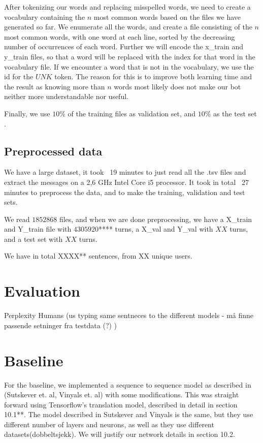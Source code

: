 \documentclass{article} %
\begin{document}
After tokenizing our words and replacing misspelled words, we need to create a vocabulary containing the $n$ most common words based on the files we have generated so far. We enumerate all the words, and create a file consisting of the $n$ most common words, with one word at each line, sorted by the decreasing number of occurrences of each word. Further we will encode the x\_train and y\_train files, so that a word will be replaced with the index for that word in the vocabulary file. If we encounter a word that is not in the vocabulary, we use the id for the $UNK$ token. The reason for this is to improve both learning time and the result as knowing more than $n$ words most likely does not make our bot neither more understandable nor useful.

Finally, we use $10\%$ of the training files as validation set, and  $10\%$ as the test set . 

\subsection{Preprocessed data}
We have a large dataset, it took ~19 minutes to just read all the .tsv files and extract the messages on a 2,6 GHz Intel Core i5 processor. It took in total ~27 minutes to preprocess the data, and to make the training, validation and test sets. 

We read $1852868$ files, and when we are done preprocessing, we have a X\_train and Y\_train file with $4305920$**** turns, a X\_val and Y\_val with $XX$ turns, and a test set with $XX$ turns.

We have in total XXXX** sentences, from XX unique users.

\section{Evaluation}
Perplexity
Humans (us typing same sentneces to the different models - må finne passende setninger fra testdata (?) )

\section{Baseline}
For the baseline, we implemented a sequence to sequence model as described in (Sutskever et. al, Vinyals et. al) with some modifications. This was straight forward using Tensorflow's translation model, described in detail in section 10.1**. The model described in Sutskever and Vinyals is the same, but they use different number of layers and neurons, as well as they use different datasets(dobbeltsjekk). We will justify our network details in section 10.2.
\end{document}
